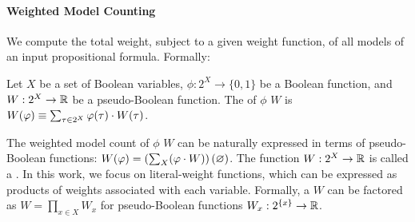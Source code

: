 
\paragraph{\textbf{Weighted Model Counting}}

We compute the total weight, subject to a given weight function, of all models of an input propositional formula.
Formally:
\begin{definition}
    Let $X$ be a set of Boolean variables, $\phi: 2^X \to \{0,1\}$ be a Boolean function, and $W: 2^X \to \mathbb{R}$ be a pseudo-Boolean function.
    The  of $\phi$ \wrt{} $W$ is
    $W(\varphi) \equiv \sum_{\tau \in 2^X} \varphi(\tau) \cdot W(\tau)$.
\end{definition}

The weighted model count of $\phi$ \wrt{} $W$ can be naturally expressed in terms of pseudo-Boolean functions: $W(\varphi) = \left(\sum_X (\varphi \cdot W) \right)(\varnothing)$.
The function $W: 2^X \to \mathbb{R}$ is called a .
In this work, we focus on {literal-weight functions}, which can be expressed as products of weights associated with each variable.
Formally, a  $W$ can be factored as $W = \prod_{x \in X} W_x$ for pseudo-Boolean functions $W_x: 2^{\{x\}} \to \mathbb{R}$.




